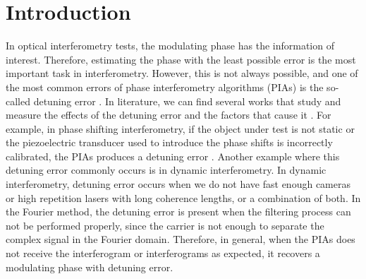 \section{Introduction}
In optical interferometry tests, the modulating phase has the information of
interest. Therefore, estimating the phase with the least possible error is the 
most important task in interferometry. However, this is not always possible, 
and one of the most common errors of phase interferometry algorithms (PIAs) 
is the so-called detuning error 
\cite{Malacara,GeneralTheory,Mosino:09, fringePatternAnalisys}. In literature,
we can find several works that study and measure the effects of the detuning
error and the factors that cause it \cite{PhaseDetuning_0, PhaseDetuning_1, 
Malacara, Mosino:10, ShopTesting, AccuracyPSI_1, deGroot:95,
Schmit:95, Gutmann:98, Servin:10}. For example, in phase shifting
interferometry, if the object under test is not static or the piezoelectric
transducer used to introduce the phase shifts is incorrectly calibrated, the
PIAs produces a detuning error \cite{Gonzalez:11,Schwider:93}. 
Another example where this detuning error commonly occurs is in dynamic 
interferometry. In dynamic interferometry, detuning error occurs when we 
do not have fast enough cameras or high repetition lasers with long coherence 
lengths, or a combination of both. In the Fourier method, the detuning error is 
present when the filtering process can not be performed properly, since the 
carrier is not enough to separate the complex signal in the Fourier domain. 
Therefore, in general, when the PIAs does not receive the interferogram or 
interferograms as expected, it recovers a modulating phase with detuning error.

